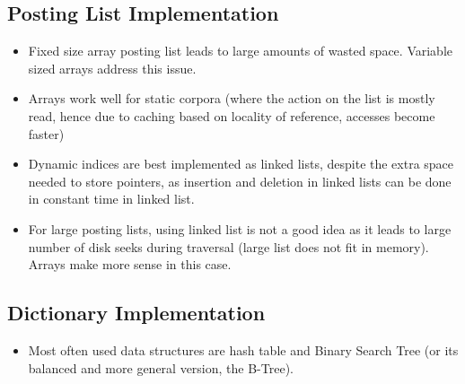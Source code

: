 \documentclass{article}
\begin{document}
\subsection{Posting List Implementation}
\begin{itemize}
    \item Fixed size array posting list leads to large amounts of wasted space. Variable sized arrays address this issue.
    
    \item Arrays work well for static corpora (where the action on the list is mostly read, hence due to caching based on locality of reference, accesses become faster)
    
    \item Dynamic indices are best implemented as linked lists, despite the extra space needed to store pointers, as insertion and deletion in linked lists can be done in constant time in linked list. 
    
    \item For large posting lists, using linked list is not a good idea as it leads to large number of disk seeks during traversal (large list does not fit in memory). Arrays make more sense in this case.
\end{itemize}

\subsection{Dictionary Implementation}
\begin{itemize}
    \item Most often used data structures are hash table and Binary Search Tree (or its balanced and more general version, the B-Tree).
\end{itemize}
\end{document}
